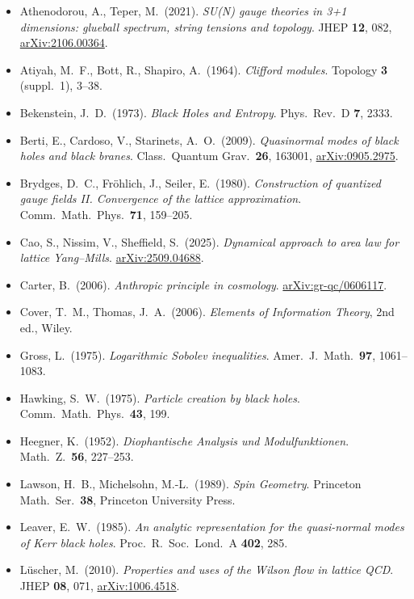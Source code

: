 \documentclass[11pt,a4paper]{article}
\begin{document}
\small
\begin{itemize}[leftmargin=*,itemsep=2pt]
  \item Athenodorou, A., Teper, M.\ (2021). \emph{SU(N) gauge theories in 3+1 dimensions: glueball spectrum, string tensions and topology}. JHEP \textbf{12}, 082, \href{https://arxiv.org/abs/2106.00364}{arXiv:2106.00364}.
  \item Atiyah, M.~F., Bott, R., Shapiro, A.\ (1964). \emph{Clifford modules}. Topology \textbf{3} (suppl.\ 1), 3--38.
  \item Bekenstein, J.~D.\ (1973). \emph{Black Holes and Entropy}. Phys.\ Rev.\ D \textbf{7}, 2333.
  \item Berti, E., Cardoso, V., Starinets, A.~O.\ (2009). \emph{Quasinormal modes of black holes and black branes}. Class.\ Quantum Grav.\ \textbf{26}, 163001, \href{https://arxiv.org/abs/0905.2975}{arXiv:0905.2975}.
  \item Brydges, D.~C., Fröhlich, J., Seiler, E.\ (1980). \emph{Construction of quantized gauge fields II. Convergence of the lattice approximation}. Comm.\ Math.\ Phys.\ \textbf{71}, 159--205.
  \item Cao, S., Nissim, V., Sheffield, S.\ (2025). \emph{Dynamical approach to area law for lattice Yang--Mills}. \href{https://arxiv.org/abs/2509.04688}{arXiv:2509.04688}.
  \item Carter, B.\ (2006). \emph{Anthropic principle in cosmology}. \href{https://arxiv.org/abs/gr-qc/0606117}{arXiv:gr-qc/0606117}.
  \item Cover, T.~M., Thomas, J.~A.\ (2006). \emph{Elements of Information Theory}, 2nd ed., Wiley.
  \item Gross, L.\ (1975). \emph{Logarithmic Sobolev inequalities}. Amer.\ J.\ Math.\ \textbf{97}, 1061--1083.
  \item Hawking, S.~W.\ (1975). \emph{Particle creation by black holes}. Comm.\ Math.\ Phys.\ \textbf{43}, 199.
  \item Heegner, K.\ (1952). \emph{Diophantische Analysis und Modulfunktionen}. Math.\ Z.\ \textbf{56}, 227--253.
  \item Lawson, H.~B., Michelsohn, M.-L.\ (1989). \emph{Spin Geometry}. Princeton Math.\ Ser.\ \textbf{38}, Princeton University Press.
  \item Leaver, E.~W.\ (1985). \emph{An analytic representation for the quasi-normal modes of Kerr black holes}. Proc.\ R.\ Soc.\ Lond.\ A \textbf{402}, 285.
  \item Lüscher, M.\ (2010). \emph{Properties and uses of the Wilson flow in lattice QCD}. JHEP \textbf{08}, 071, \href{https://arxiv.org/abs/1006.4518}{arXiv:1006.4518}.

\end{itemize}
\end{document}

